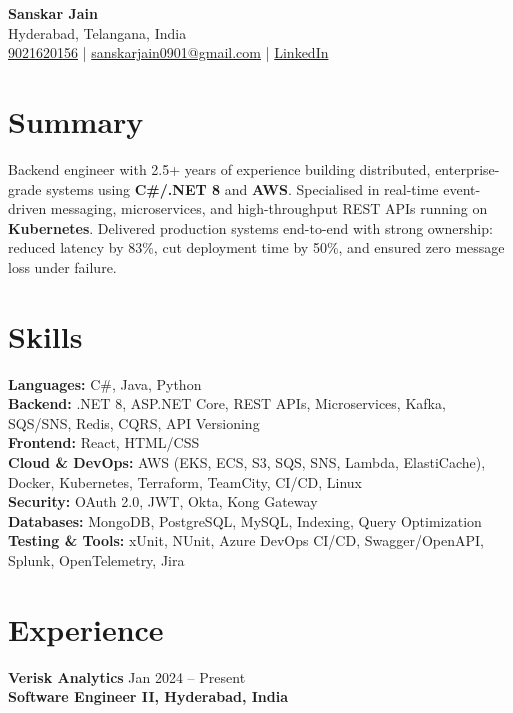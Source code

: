 \documentclass[letterpaper,10pt]{article}
\begin{document}
\begin{center}
    {\LARGE \textbf{Sanskar Jain}} \\
    Hyderabad, Telangana, India \\
    \href{tel:9021620156}{9021620156} \;|\;
    \href{mailto:sanskarjain0901@gmail.com}{sanskarjain0901@gmail.com} \;|\;
    \href{https://www.linkedin.com/in/sanskar-jain0901/}{LinkedIn}
\end{center}

\vspace{1pt}

\section*{Summary}
Backend engineer with 2.5+ years of experience building distributed, enterprise-grade systems using \textbf{C\#/.NET 8} and \textbf{AWS}.
Specialised in real-time event-driven messaging, microservices, and high-throughput REST APIs running on \textbf{Kubernetes}.
Delivered production systems end-to-end with strong ownership: reduced latency by 83\%, cut deployment time by 50\%, and ensured zero message loss under failure.

\section*{Skills}
\textbf{Languages:} C\#, Java, Python \\
\textbf{Backend:} .NET 8, ASP.NET Core, REST APIs, Microservices, Kafka, SQS/SNS, Redis, CQRS, API Versioning \\
\textbf{Frontend:} React, HTML/CSS \\
\textbf{Cloud \& DevOps:} AWS (EKS, ECS, S3, SQS, SNS, Lambda, ElastiCache), Docker, Kubernetes, Terraform, TeamCity, CI/CD, Linux \\
\textbf{Security:} OAuth 2.0, JWT, Okta, Kong Gateway \\
\textbf{Databases:} MongoDB, PostgreSQL, MySQL, Indexing, Query Optimization \\
\textbf{Testing \& Tools:} xUnit, NUnit, Azure DevOps CI/CD, Swagger/OpenAPI, Splunk, OpenTelemetry, Jira

\section*{Experience}

\textbf{Verisk Analytics} \hfill Jan 2024 -- Present \\
\textbf{Software Engineer II, Hyderabad, India}
\end{document}
